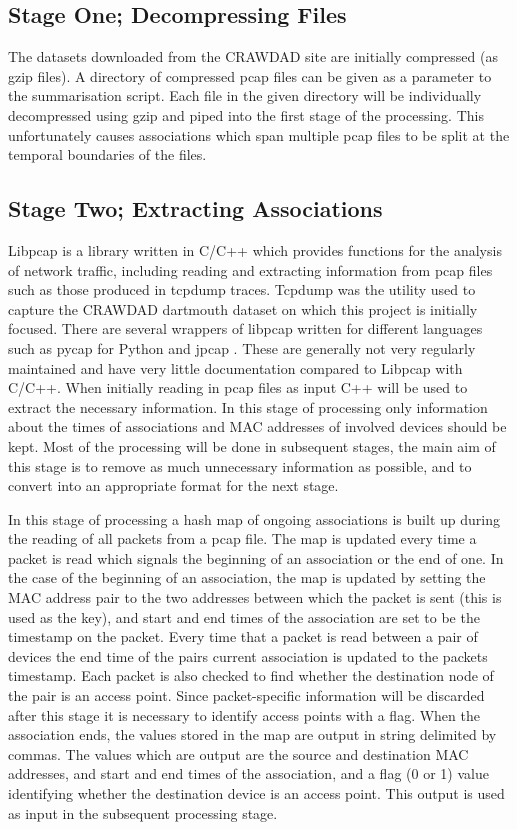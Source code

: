 \subsection{Stage One; Decompressing Files}

The datasets downloaded from the CRAWDAD site are initially compressed (as gzip files). A directory of compressed pcap files can be given as a parameter to the summarisation script. Each file in the given directory will be individually decompressed using gzip and piped into the first stage of the processing. This unfortunately causes associations which span multiple pcap files to be split at the temporal boundaries of the files.

\subsection{Stage Two; Extracting Associations}

Libpcap is a library written in C/C++ which provides functions for the analysis of network traffic, including reading and extracting information from pcap files such as those produced in tcpdump traces. Tcpdump was the utility used to capture the CRAWDAD dartmouth dataset on which this project is initially focused. There are several wrappers of libpcap written for different languages such as pycap \cite{pynetwork2019} for Python and jpcap \cite{charles2013}. These are generally not very regularly maintained and have very little documentation compared to Libpcap with C/C++. When initially reading in pcap files as input C++ will be used to extract the necessary information. In this stage of processing only information about the times of associations and MAC addresses of involved devices should be kept. Most of the processing will be done in subsequent stages, the main aim of this stage is to remove as much unnecessary information as possible, and to convert into an appropriate format for the next stage.

In this stage of processing a hash map of ongoing associations is built up during the reading of all packets from a pcap file. The map is updated every time a packet is read which signals the beginning of an association or the end of one. In the case of the beginning of an association, the map is updated by setting the MAC address pair to the two addresses between which the packet is sent (this is used as the key), and start and end times of the association are set to be the timestamp on the packet. Every time that a packet is read between a pair of devices the end time of the pairs current association is updated to the packets timestamp. Each packet is also checked to find whether the destination node of the pair is an access point. Since packet-specific information will be discarded after this stage it is necessary to identify access points with a flag. When the association ends, the values stored in the map are output in string delimited by commas. The values which are output are the source and destination MAC addresses, and start and end times of the association, and a flag (0 or 1) value identifying whether the destination device is an access point. This output is used as input in the subsequent processing stage.

